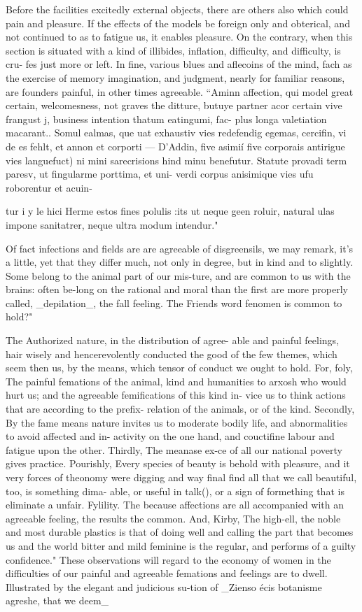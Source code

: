 Before the facilities excitedly external objects, there are others also which could pain and pleasure. If the effects of the models be foreign only and obterical, and not continued to as to fatigue us, it enables pleasure. On the contrary, when this section is situated with a kind of illibides, inflation, difficulty, and difficulty, is cru-
fes just more or left. In fine, various blues and aflecoins of the mind, fach as the exercise of memory imagination, and judgment, nearly for familiar reasons, are founders painful, in other times agreeable. “Aminn affection, qui model great certain, welcomesness, not graves the ditture, butuye partner acor certain vive frangust j, business intention thatum eatingumi, fac-
plus longa valetiation macarant.. Somul ealmas, que uat exhaustiv vies redefendig egemas, cercifin, vi de es fehlt, et annon et corporti — D'Addin, five asimií five corporais antirigue vies languefuct) ni mini sarecrisions hind minu benefutur. Statute provadi term paresv, ut fingularme porttima, et uni- verdi corpus anisimique vies ufu roborentur et acuin-\par\medskip
tur i y le hici Herme estos fines polulis :its ut neque geen roluir, natural ulas impone sanitatrer, neque ultra
modum intendur."\par\medskip
Of fact infections and fields are are agreeable of disgreensils, we may remark, it’s a little, yet that they differ much, not only in degree, but in kind and to slightly. Some belong to the animal part of our mis-ture, and are common to us with the brains: often be-long on the rational and moral than the first are more properly called, \_depilation\_, the fall feeling. The Friends word fenomen is common to hold?"\par\medskip
The Authorized nature, in the distribution of agree- able and painful feelings, hair wisely and hencerevolently conducted the good of the few themes, which seem then us, by the means, which tensor of conduct we ought to hold. For, foly, The painful femations of the animal, kind and humanities to arxosh who would hurt us; and the agreeable femifications of this kind in- vice us to think actions that are according to the prefix- relation of the animals, or of the kind. Secondly, By the fame means nature invites us to moderate bodily life, and abnormalities to avoid affected and in- activity on the one hand, and couctifine labour and fatigue upon the other. Thirdly, The meanase ex-ce of all our national poverty gives practice. Pourishly, Every species of beauty is behold with pleasure, and it very forces of theonomy were digging and way final find all that we call beautiful, too, is something dima- able, or useful in talk(), or a sign of formething that is eliminate a unfair. Fylility. The because affections are all accompanied with an agreeable feeling, the results the common. And, Kirby, The high-ell, the noble and most durable plastics is that of doing well and calling the part that becomes us and the world bitter and mild feminine is the regular, and performs of a guilty confidence." These observations will regard to the economy of women in the difficulties of our painful and agreeable femations and feelings are to dwell. Illustrated by the elegant and judicious su-tion of \_Zienso écis botanisme agreshe, that we deem\_
